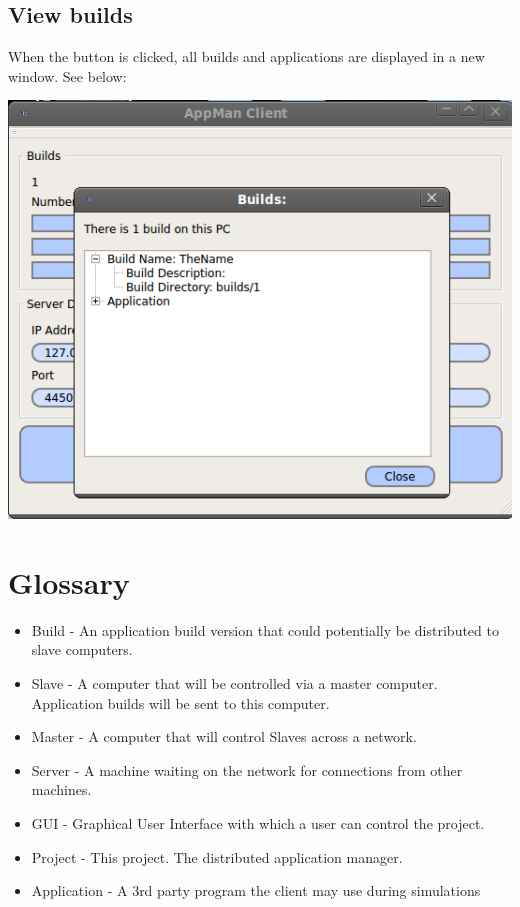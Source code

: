 \documentclass[a4paper,12pt,final]{article}
\begin{document}
\subsection{View builds}
When the button is clicked, all builds and applications are displayed in a new window. See below:


\begin{center}
  	\includegraphics[scale=0.4]{SlaveBuilds.png}
 \end{center}

\newpage
\section{Glossary}
\begin{itemize}
\item{Build - An application build version that could potentially be distributed to slave computers.}
\item{Slave - A computer that will be controlled via a master computer. Application builds will be sent to this computer.}
\item{Master - A computer that will control Slaves across a network.}
\item{Server - A machine waiting on the network for connections from other machines.}
\item{GUI - Graphical User Interface with which a user can control the project.}
\item{Project - This project. The distributed application manager.}
\item{Application - A 3rd party program the client may use during simulations}
\end{itemize}
\end{document}
